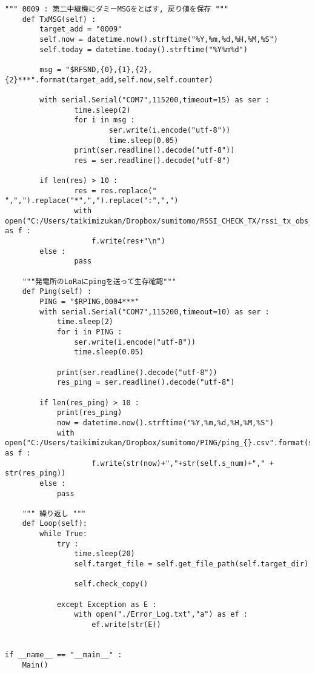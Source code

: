\begin{lstlisting}[label=loras,caption=LoRa\_obs\_transmit.py]
        """ 0009 : 第二中継機にダミーMSGをとばす, 戻り値を保存 """
    def TxMSG(self) :
        target_add = "0009"
        self.now = datetime.now().strftime("%Y,%m,%d,%H,%M,%S")
        self.today = datetime.today().strftime("%Y%m%d")
        
        msg = "$RFSND,{0},{1},{2},{2}***".format(target_add,self.now,self.counter)

        with serial.Serial("COM7",115200,timeout=15) as ser :
                time.sleep(2)
                for i in msg :
                        ser.write(i.encode("utf-8"))
                        time.sleep(0.05)
                print(ser.readline().decode("utf-8"))
                res = ser.readline().decode("utf-8")

        if len(res) > 10 :
                res = res.replace(" ",",").replace("*",",").replace(":",",")
                with open("C:/Users/taikimizukan/Dropbox/sumitomo/RSSI_CHECK_TX/rssi_tx_obs_{}.csv".format(str(self.today)),"a") as f :
                    f.write(res+"\n")                  
        else :
                pass

    """発電所のLoRaにpingを送って生存確認"""
    def Ping(self) :
        PING = "$RPING,0004***"
        with serial.Serial("COM7",115200,timeout=10) as ser :
            time.sleep(2)
            for i in PING :
                ser.write(i.encode("utf-8"))
                time.sleep(0.05)

            print(ser.readline().decode("utf-8"))
            res_ping = ser.readline().decode("utf-8")
                
        if len(res_ping) > 10 :
            print(res_ping)
            now = datetime.now().strftime("%Y,%m,%d,%H,%M,%S")
            with open("C:/Users/taikimizukan/Dropbox/sumitomo/PING/ping_{}.csv".format(str(self.today)),"a") as f :
                    f.write(str(now)+","+str(self.s_num)+"," + str(res_ping))
        else :
            pass

    """ 繰り返し """
    def Loop(self):  
        while True:
            try :
                time.sleep(20)
                self.target_file = self.get_file_path(self.target_dir)

                self.check_copy()
            
            except Exception as E :
                with open("./Error_Log.txt","a") as ef :
                    ef.write(str(E))


if __name__ == "__main__" :
    Main()
\end{lstlisting}
%
\clearpage
